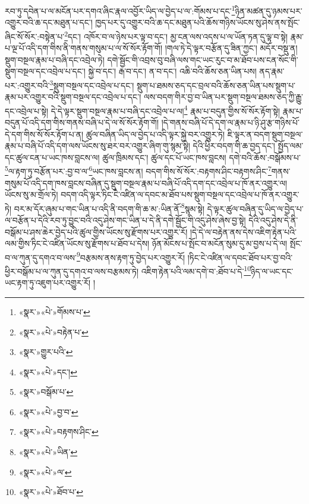 རབ་ཏུ་དབེན་པ་ལ་མངོན་པར་དགའ་ཞིང་རྣལ་འབྱོར་ཡིད་ལ་བྱེད་པ་ལ་:གོམས་པ་དང་\footnote{«སྣར་»«པེ་»གོམས་པ་}ཉིན་མཚན་དུ་ཉམས་པར་འགྱུར་བའི་ཆ་དང་མཐུན་པ་དང་། ཁྱད་པར་དུ་འགྱུར་བའི་ཆ་དང་མཐུན་པའི་ཆོས་གཉིས་ཡོངས་སུ་ཤེས་ནས་སྤོང་ཞིང་སོ་སོར་:བསྟེན་པ་\footnote{«སྣར་»«པེ་»བརྟེན་པ་}དང་། འཁོར་བ་ལ་ཉེས་པར་ལྟ་བ་དང་། མྱ་ངན་ལས་འདས་པ་ལ་ཡོན་ཏན་དུ་ལྟ་བ་སྟེ། རྣམ་པ་ལྔ་པོ་འདི་དག་གིས་ནི་གནས་གསུམ་པ་ལ་སོ་སོར་རྟོག་གོ། །གལ་ཏེ་དེ་ལྟར་བརྩོན་དུ་ཟིན་ཀྱང་། མདོར་བསྡུ་ན། སྡུག་བསྔལ་རྣམ་པ་བཞི་དང་འབྲེལ་ཏེ། དགེ་སྦྱོང་གི་འབྲས་བུ་བཞི་ལས་གང་ཡང་རུང་བ་མ་ཐོབ་པས་ངན་སོང་གི་སྡུག་བསྔལ་དང་འབྲེལ་པ་དང་། སྐྱེ་བ་དང་། རྒ་བ་དང་། ན་བ་དང་། འཆི་བའི་ཆོས་ཅན་ཡིན་པས། ནད་རྣམ་པར་:འགྱུར་བའི་\footnote{«སྣར་»གྱུར་པའི་}སྡུག་བསྔལ་དང་འབྲེལ་པ་དང་། སྡུག་པ་ཐམས་ཅད་དང་བྲལ་བའི་ཆོས་ཅན་ཡིན་པས་སྡུག་པ་རྣམ་པར་འགྱུར་བའི་སྡུག་བསྔལ་དང་འབྲེལ་པ་དང་། ལས་བདག་གིར་བྱ་བ་ཡིན་པར་སྡུག་བསྔལ་ཐམས་ཅད་ཀྱི་རྒྱུ་དང་འབྲེལ་པ་སྟེ། དེ་དེ་ལྟར་སྡུག་བསྔལ་རྣམ་པ་བཞི་དང་འབྲེལ་པ་ལ།\footnote{«སྣར་»«པེ་»དང་།} རྣམ་པ་བདུན་གྱིས་སོ་སོར་རྟོག་སྟེ། རྣམ་པ་བདུན་པོ་འདི་དག་གིས་གནས་བཞི་པ་དེ་ལ་སོ་སོར་རྟོག་གོ། །དེ་གནས་བཞི་པོ་དེ་དག་ལ་རྣམ་པ་ཉི་ཤུ་རྩ་གཉིས་པོ་དེ་དག་གིས་སོ་སོར་རྟོག་པ་ན། ཚུལ་བཞིན་ཡིད་ལ་བྱེད་པ་འདི་ལྟར་སྐྱེ་བར་འགྱུར་ཏེ། ཇི་ལྟར་ན་བདག་སྡུག་བསྔལ་རྣམ་པ་བཞི་པོ་འདི་དག་ལས་ཡོངས་སུ་ཐར་བར་འགྱུར་ཞིག་གུ་སྙམ་སྟེ། དེའི་ཕྱིར་བདག་གི་ཆ་བྱད་དང་། སྤྱོད་ལམ་དང་ཚུལ་ངན་པ་ཡང་ཁས་བླངས་ལ། ཚུལ་ཁྲིམས་དང་། ཚུལ་དང་པོ་ཡང་ཁས་བླངས། དགེ་བའི་ཆོས་:བསྒོམས་པ་\footnote{«སྣར་»བསྒོམ་པ་}ལ་རྟག་ཏུ་བརྩོན་པར་:བྱ་བ་ལ་\footnote{«སྣར་»«པེ་»བྱ་བ་}ཡང་ཁས་བླངས་ན། བདག་གིས་སོ་སོར་:བརྟགས་ཤིང་བརྟགས་ཤིང་\footnote{«སྣར་»«པེ་»བརྟགས་ཤིང་}གནས་གསུམ་པོ་འདི་དག་ཁས་བླངས་བཞིན་དུ་སྡུག་བསྔལ་རྣམ་པ་བཞི་པོ་འདི་དག་དང་འབྲེལ་པ་ཁོ་ནར་འགྱུར་ལ། ཡོངས་སུ་མ་གྲོལ་ཏེ། བདག་འདི་ལྟར་ཏིང་ངེ་འཛིན་ལ་དབང་མ་ཐོབ་པས་སྡུག་བསྔལ་དང་འབྲེལ་པ་ཁོ་ནར་འགྱུར་ཏེ། བར་མ་དོར་ཞུམ་པ་གང་ཡིན་པ་འདི་ནི་བདག་གི་ཆ་མ་:ཡིན་ནོ་\footnote{«སྣར་»«པེ་»ཡིན་}སྙམ་སྟེ། དེ་ལྟར་ཚུལ་བཞིན་དུ་ཡིད་ལ་བྱེད་པ་ལ་བརྩོན་པ་དེའི་རབ་ཏུ་བྱུང་བའི་འདུ་ཤེས་གང་ཡིན་པ་དེ་ནི་དགེ་སྦྱོང་གི་འདུ་ཤེས་ཞེས་བྱ་སྟེ། དེའི་འདུ་ཤེས་དེ་ནི་བསྒོམ་པ་ཤས་ཆེར་བྱེད་པའི་ཚུལ་གྱིས་ཡོངས་སུ་རྫོགས་པར་འགྱུར་རོ། །དེ་དེ་ལ་བརྟེན་ནས་དེས་འཇིག་རྟེན་པའི་ལམ་གྱིས་ཏིང་ངེ་འཛིན་ཡོངས་སུ་རྫོགས་པ་ཐོབ་པ་དེས། ཉོན་མོངས་པ་སྤོང་བ་མངོན་སུམ་དུ་མ་བྱས་པ་དེ་ལ། སྤོང་བ་ལ་ཀུན་དུ་དགའ་བ་ལས་\footnote{«སྣར་»«པེ་»ལ་}བརྩམས་ནས་རྟག་ཏུ་བྱེད་པར་འགྱུར་རོ། །ཏིང་ངེ་འཛིན་ལ་དབང་ཐོབ་པར་བྱ་བའི་ཕྱིར་བསྒོམ་པ་ལ་ཀུན་དུ་དགའ་བ་ལས་བརྩམས་ཏེ། འཇིག་རྟེན་པའི་ལམ་དགེ་བ་:ཐོབ་པ་དེ་\footnote{«སྣར་»«པེ་»ཐོབ་པ་}ཉིད་ལ་ཡང་དང་ཡང་རྟག་ཏུ་འཇུག་པར་འགྱུར་རོ། །
